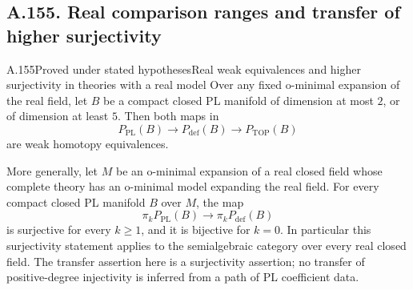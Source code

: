 \subsection{A.155. Real comparison ranges and transfer of higher surjectivity}

\begin{saresult}{A.155}{Proved under stated hypotheses}{Real weak equivalences and higher surjectivity in theories with a real model}
Over any fixed o-minimal expansion of the real field, let \(B\) be a
compact closed PL manifold of dimension at most \(2\), or of dimension
at least \(5\). Then both maps in
\[
 P_{\mathrm{PL}}(B)\longrightarrow P_{\mathrm{def}}(B)
       \longrightarrow P_{\mathrm{TOP}}(B)
 \tag{155.1}
\]
are weak homotopy equivalences.

More generally, let \(M\) be an o-minimal expansion of a real closed
field whose complete theory has an o-minimal model expanding the real
field. For every compact closed PL manifold \(B\) over \(M\), the map
\[
 \pi_kP_{\mathrm{PL}}(B)\longrightarrow\pi_kP_{\mathrm{def}}(B)
 \tag{155.2}
\]
is surjective for every \(k\geq1\), and it is bijective for \(k=0\).
In particular this surjectivity statement applies to the semialgebraic
category over every real closed field.
The transfer assertion here is a surjectivity assertion; no transfer
of positive-degree injectivity is inferred from a path of PL
coefficient data.
\end{saresult}

